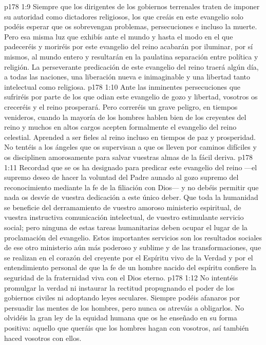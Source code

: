 \vs p178 1:9 Siempre que los dirigentes de los gobiernos terrenales traten de imponer su autoridad como dictadores religiosos, los que creáis en este evangelio solo podéis esperar que os sobrevengan problemas, persecuciones e incluso la muerte. Pero esa misma luz que exhibís ante el mundo y hasta el modo en el que padeceréis y moriréis por este evangelio del reino acabarán por iluminar, por sí mismos, al mundo entero y resultarán en la paulatina separación entre política y religión. La perseverante predicación de este evangelio del reino traerá algún día, a todas las naciones, una liberación nueva e inimaginable y una libertad tanto intelectual como religiosa.
\vs p178 1:10 Ante las inminentes persecuciones que sufriréis por parte de los que odian este evangelio de gozo y libertad, vosotros os creceréis y el reino prosperará. Pero correréis un grave peligro, en tiempos venideros, cuando la mayoría de los hombres hablen bien de los creyentes del reino y muchos en altos cargos acepten formalmente el evangelio del reino celestial. Aprended a ser fieles al reino incluso en tiempos de paz y prosperidad. No tentéis a los ángeles que os supervisan a que os lleven por caminos difíciles y os disciplinen amorosamente para salvar vuestras almas de la fácil deriva.
\vs p178 1:11 Recordad que se os ha designado para predicar este evangelio del reino ---el supremo deseo de hacer la voluntad del Padre aunado al gozo supremo del reconocimiento mediante la fe de la filiación con Dios--- y no debéis permitir que nada os desvíe de vuestra dedicación a este único deber. Que toda la humanidad se beneficie del derramamiento de vuestro amoroso ministerio espiritual, de vuestra instructiva comunicación intelectual, de vuestro estimulante servicio social; pero ninguna de estas tareas humanitarias deben ocupar el lugar de la proclamación del evangelio. Estos importantes servicios son los resultados sociales de ese otro ministerio aún más poderoso y sublime y de las transformaciones, que se realizan en el corazón del creyente por el Espíritu vivo de la Verdad y por el entendimiento personal de que la fe de un hombre nacido del espíritu confiere la seguridad de la fraternidad viva con el Dios eterno.
\vs p178 1:12 No intentéis promulgar la verdad ni instaurar la rectitud propugnando el poder de los gobiernos civiles ni adoptando leyes seculares. Siempre podéis afanaros por persuadir las mentes de los hombres, pero nunca os atreváis a obligarlos. No olvidéis la gran ley de la equidad humana que os he enseñado en su forma positiva: aquello que queráis que los hombres hagan con vosotros, así también haced vosotros con ellos.
